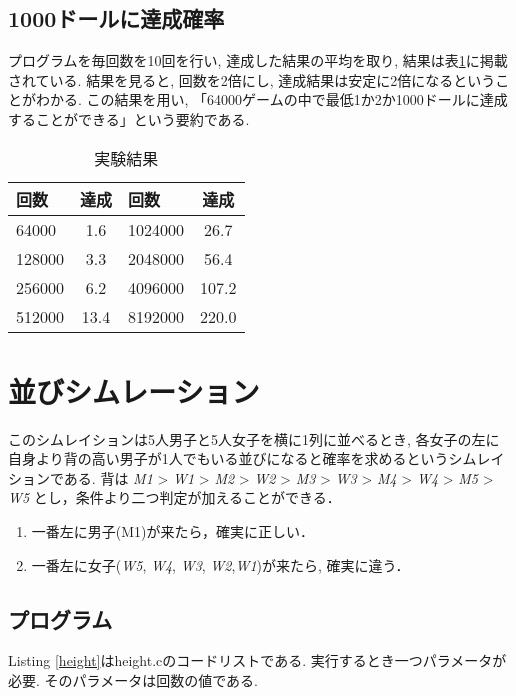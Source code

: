 \documentclass[a4j, titlepage]{jarticle}
\begin{document}
\subsection{1000ドールに達成確率}
プログラムを毎回数を10回を行い, 達成した結果の平均を取り, 結果は表\ref{table:roul}に掲載されている.
結果を見ると, 回数を2倍にし, 達成結果は安定に2倍になるということがわかる. この結果を用い, 「64000ゲームの中で最低1か2か1000ドールに達成することができる」という要約である.

\begin{table}[bth]
    \label{table:roul}
    \caption{実験結果}
    \begin{center}
    \begin{tabular}{|l|c||l|c|}
    \hline
    回数 & 達成 & 回数 & 達成 \\ \hline
     64000 &  1.6 & 1024000 &  26.7 \\ \hline
    128000 &  3.3 & 2048000 &  56.4 \\ \hline
    256000 &  6.2 & 4096000 & 107.2 \\ \hline
    512000 & 13.4 & 8192000 & 220.0 \\ \hline
\end{tabular}
\end{center}
\end{table}
\section{並びシムレーション}
このシムレイションは5人男子と5人女子を横に1列に並べるとき, 各女子の左に自身より背の高い男子が1人でもいる並びになると確率を求めるというシムレイションである. 背は \textit{M1} > \textit{W1} > \textit{M2} > \textit{W2} > \textit{M3} > \textit{W3} > \textit{M4} > \textit{W4} > \textit{M5} > \textit{W5} とし，条件より二つ判定が加えることができる．
\begin{enumerate}
    \item 一番左に男子(M1)が来たら，確実に正しい．
    \item 一番左に女子(\textit{W5}, \textit{W4}, \textit{W3}, \textit{W2},\textit{W1})が来たら, 確実に違う．
\end{enumerate}

\subsection{プログラム}
Listing \ref{height}はheight.cのコードリストである. 実行するとき一つパラメータが必要. そのパラメータは回数の値である. 
\end{document}
